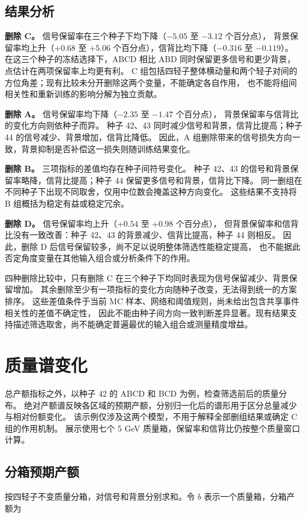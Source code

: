 \documentclass[11pt,a4paper,fontset=fandol,scheme=plain]{ctexart}
\begin{document}
\subsection{结果分析}
\textbf{删除 C。} 信号保留率在三个种子下均下降（$-5.05$ 至 $-3.12$ 个百分点），
背景保留率均上升（$+0.68$ 至 $+5.06$ 个百分点），信背比均下降（$-0.316$ 至 $-0.119$）。
在这三个种子的冻结选择下，ABCD 相比 ABD 同时保留更多信号和更少背景，点估计在两项保留率上均更有利。
C 组包括四轻子整体横动量和两个轻子对间的方位角差；现有比较未分开删除这两个变量，不能确定各自作用，
也不能将组间相关性和重新训练的影响分解为独立贡献。

\textbf{删除 A。} 信号保留率均下降（$-2.35$ 至 $-1.47$ 个百分点），
背景保留率与信背比的变化方向则依种子而异。
种子 42、43 同时减少信号和背景，信背比提高；种子 44 的信号减少、背景增加，信背比降低。
因此，A 组删除带来的信号损失方向一致，背景抑制是否补偿这一损失则随训练结果变化。

\textbf{删除 B。} 三项指标的差值均存在种子间符号变化。
种子 42、43 的信号和背景保留率略降，信背比提高；种子 44 保留更多信号和背景，信背比下降。
同一删组在不同种子下出现不同取舍，仅用中位数会掩盖这种方向变化。
这些结果不支持将 B 组概括为稳定有益或稳定冗余。

\textbf{删除 D。} 信号保留率均上升（$+0.54$ 至 $+0.98$ 个百分点），
但背景保留率和信背比没有一致改善：种子 42、43 的背景减少、信背比提高，种子 44 则相反。
因此，删除 D 后信号保留较多，尚不足以说明整体筛选性能稳定提高，
也不能据此否定角度变量在其他输入组合或分析条件下的作用。

四种删除比较中，只有删除 C 在三个种子下均同时表现为信号保留减少、背景保留增加。
其余删除至少有一项指标的变化方向随种子改变，无法得到统一的方案排序。
这些差值条件于当前 MC 样本、网络和阈值规则，尚未给出包含共享事件相关性的差值不确定性，
因此不能由种子间方向一致判断差异显著。现有结果支持描述筛选取舍，尚不能确定普遍最优的输入组合或测量精度增益。

\FloatBarrier


\section{质量谱变化}
总产额指标之外，以种子 42 的 ABCD 和 BCD 为例，检查筛选前后的质量分布。
绝对产额谱反映各区域的预期产额，分别归一化后的谱形用于区分总量减少与相对份额变化。
该示例仅涉及这两个模型，不用于解释全部删组结果或确定 C 组的作用机制。
展示使用七个 5 GeV 质量箱，保留率和信背比仍按整个质量窗口计算。

\subsection{分箱预期产额}
按四轻子不变质量分箱，对信号和背景分别求和。令 $b$ 表示一个质量箱，分箱产额为
\end{document}
